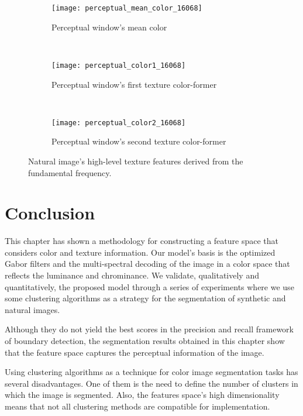 \begin{figure}[!ht]
    \centering
    \begin{subfigure}[b]{0.7\textwidth}
    	\texttt{[image: perceptual\_mean\_color\_16068]}
        \caption{Perceptual window's mean color}
        \label{fig:perceptual_mean_color_16068}
    \end{subfigure}\\
    \begin{subfigure}[b]{0.7\textwidth}
    	\texttt{[image: perceptual\_color1\_16068]}
        \caption{Perceptual window's first texture color-former}
        \label{fig:perceptual_color1_16068}
    \end{subfigure}\\
    \begin{subfigure}[b]{0.7\textwidth}
    	\texttt{[image: perceptual\_color2\_16068]}
        \caption{Perceptual window's second texture color-former}
        \label{fig:perceptual_color2_16068}
    \end{subfigure}    
                  
    \caption{Natural image's high-level texture features derived from the fundamental frequency.}\label{fig:colors_high_level_features_zebre}    
\end{figure}


\section{Conclusion}
This chapter has shown a methodology for constructing a feature space that considers color and texture information. Our model's basis is the optimized Gabor filters and the multi-spectral decoding of the image in a color space that reflects the luminance and chrominance.
We validate, qualitatively and quantitatively, the proposed model through a series of experiments where we use some clustering algorithms as a strategy for the segmentation of synthetic and natural images.

Although they do not yield the best scores in the precision and recall framework of boundary detection, the segmentation results obtained in this chapter show that the feature space captures the perceptual information of the image.

Using clustering algorithms as a technique for color image segmentation tasks has several disadvantages. One of them is the need to define the number of clusters in which the image is segmented. Also, the features space's high dimensionality means that not all clustering methods are compatible for implementation.

